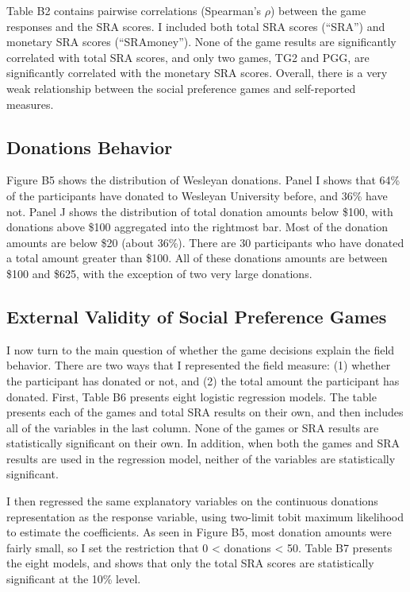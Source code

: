\documentclass[12pt]{article}
\begin{document}
Table B2 contains pairwise correlations (Spearman\rq s \(\rho\)) between the game responses and the SRA scores. I included both total SRA scores (``SRA'') and monetary SRA scores (``SRAmoney''). None of the game results are significantly correlated with total SRA scores, and only two games, TG2 and PGG, are significantly correlated with the monetary SRA scores. Overall, there is a very weak relationship between the social preference games and self-reported measures. 

\subsection{Donations Behavior}

Figure B5 shows the distribution of Wesleyan donations. Panel I shows that 64\% of the participants have donated to Wesleyan University before, and 36\% have not. Panel J shows the distribution of total donation amounts below \$100, with donations above \$100 aggregated into the rightmost bar. Most of the donation amounts are below \$20 (about 36\%). There are 30 participants who have donated a total amount greater than \$100. All of these donations amounts are between \$100 and \$625, with the exception of two very large donations.

\subsection{External Validity of Social Preference Games}
I now turn to the main question of whether the game decisions explain the field behavior. There are two ways that I represented the field measure: (1) whether the participant has donated or not, and (2) the total amount the participant has donated. First, Table B6 presents eight logistic regression models. The table presents each of the games and total SRA results on their own, and then includes all of the variables in the last column. None of the games or SRA results are statistically significant on their own. In addition, when both the games and SRA results are used in the regression model, neither of the variables are statistically significant.

I then regressed the same explanatory variables on the continuous donations representation as the response variable, using two-limit tobit maximum likelihood to estimate the coefficients. As seen in Figure B5, most donation amounts were fairly small, so I set the restriction that 0 < donations < 50. Table B7 presents the eight models, and shows that only the total SRA scores are statistically significant at the 10\% level.
\end{document}
